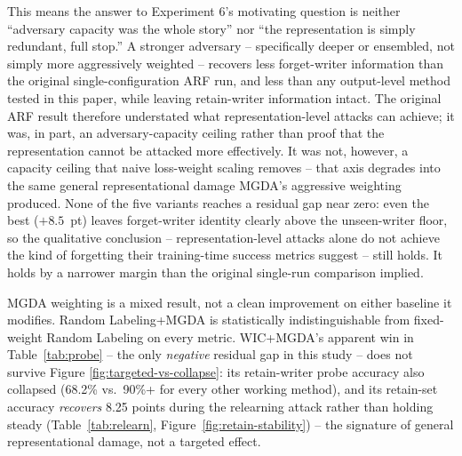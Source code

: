 \documentclass[a4paper,fleqn]{cas-dc}
\begin{document}
This means the answer to Experiment 6's motivating question is neither
``adversary capacity was the whole story'' nor ``the representation is
simply redundant, full stop.'' A stronger adversary -- specifically
deeper or ensembled, not simply more aggressively weighted -- recovers
less forget-writer information than the original single-configuration ARF
run, and less than any output-level method tested in this paper, while
leaving retain-writer information intact. The original ARF result
therefore understated what representation-level attacks can achieve; it
was, in part, an adversary-capacity ceiling rather than proof that the
representation cannot be attacked more effectively. It was not, however, a
capacity ceiling that naive loss-weight scaling removes -- that axis
degrades into the same general representational damage MGDA's aggressive
weighting produced. None of the five variants reaches a residual gap near
zero: even the best ($+8.5$~pt) leaves forget-writer identity clearly
above the unseen-writer floor, so the qualitative conclusion --
representation-level attacks alone do not achieve the kind of forgetting
their training-time success metrics suggest -- still holds. It holds by a
narrower margin than the original single-run comparison implied.

MGDA weighting is a mixed result, not a clean improvement on either
baseline it modifies. Random Labeling+MGDA is statistically
indistinguishable from fixed-weight Random Labeling on every metric.
WIC+MGDA's apparent win in Table~\ref{tab:probe} -- the only \emph{negative}
residual gap in this study -- does not survive Figure
\ref{fig:targeted-vs-collapse}: its retain-writer probe accuracy also
collapsed (68.2\% vs.\ 90\%+ for every other working method), and its
retain-set accuracy \emph{recovers} 8.25 points during the relearning
attack rather than holding steady (Table~\ref{tab:relearn},
Figure~\ref{fig:retain-stability}) -- the signature of general
representational damage, not a targeted effect.
\end{document}
